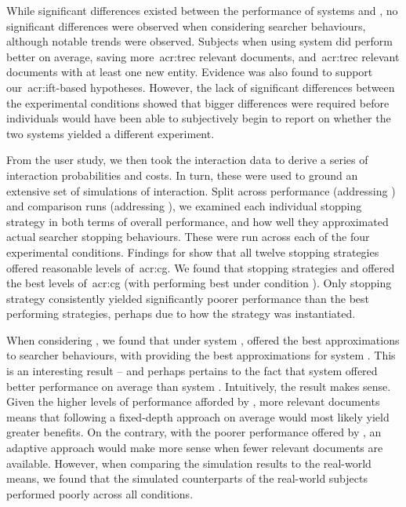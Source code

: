 While significant differences existed between the performance of systems  and , no significant differences were observed when considering searcher behaviours, although notable trends were observed. Subjects when using system  did perform better on average, saving more~\gls{acr:trec} relevant documents, and~\gls{acr:trec} relevant documents with at least one new entity. Evidence was also found to support our~\gls{acr:ift}-based hypotheses. However, the lack of significant differences between the experimental conditions showed that bigger differences were required before individuals would have been able to subjectively begin to report on whether the two systems yielded a different experiment.

From the user study, we then took the interaction data to derive a series of interaction probabilities and costs. In turn, these were used to ground an extensive set of simulations of interaction. Split across performance (addressing ) and comparison runs (addressing ), we examined each individual stopping strategy in both terms of overall performance, and how well they approximated actual searcher stopping behaviours. These were run across each of the four experimental conditions. Findings for  show that all twelve stopping strategies offered reasonable levels of~\gls{acr:cg}. We found that stopping strategies  and  offered the best levels of~\gls{acr:cg} (with  performing best under condition ). Only stopping strategy  consistently yielded significantly poorer performance than the best performing strategies, perhaps due to how the strategy was instantiated.

When considering , we found that under system ,  offered the best approximations to searcher behaviours, with  providing the best approximations for system . This is an interesting result -- and perhaps pertains to the fact that system  offered better performance on average than system . Intuitively, the result makes sense. Given the higher levels of performance afforded by , more relevant documents means that following a fixed-depth approach on average would most likely yield greater benefits. On the contrary, with the poorer performance offered by , an adaptive approach would make more sense when fewer relevant documents are available. However, when comparing the simulation results to the real-world means, we found that the simulated counterparts of the real-world subjects performed poorly across all conditions.


